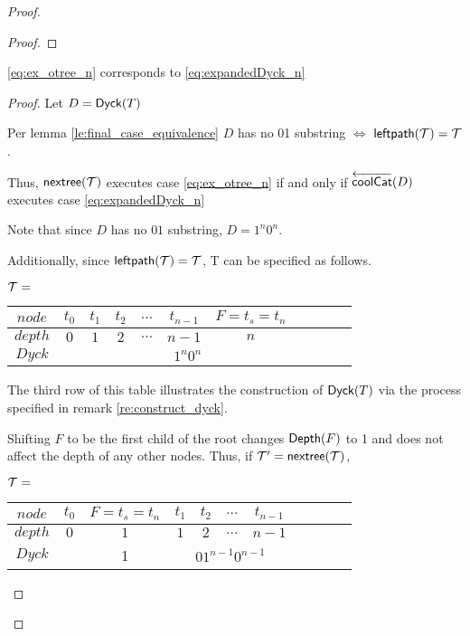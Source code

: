 \begin{proof}
\begin{proof}





\end{proof}
\begin{lemma}
    \eqref{eq:ex_otree_n} corresponds to \eqref{eq:expandedDyck_n}
\end{lemma}
\begin{proof}

    Let $D=\mathsf{Dyck}{(T)}$

    Per lemma \ref{le:final_case_equivalence} $D$ has no 01 substring $\iff$ $\mathsf{leftpath}{(\mathcal{\mathcal{T}})}=\mathcal{T}$.  

    Thus, $\mathsf{nextree}{(\mathcal{T})}$ executes case \eqref{eq:ex_otree_n} if and only if $\overleftarrow{\mathsf{coolCat}}{(D)}$ executes case  \eqref{eq:expandedDyck_n}

    Note that since $D$ has no $01$ substring, $D=1^n0^n$. 

    Additionally, since $\mathsf{leftpath}{(\mathcal{\mathcal{T}})}=\mathcal{T}$, T can be specified as follows.

    $\mathcal{T}=$
    \begin{center}
	\begin{tabular}{ |c|c|c|c|c|c|c|c|c|c|c| } 
	    \hline

	    $node$ & $t_0$ & $t_1$  & $t_2$ & $\dots$ & $t_{n-1}$&$F=t_s=t_n$  \\
	    \hline
	    $depth$ & $0$ & $1$ & $2$ & $\dots$ & $n-1$ & $n$ \\
	    \hline
	    $Dyck$ &  &  \multicolumn{5}{|c|}{$1^n0^n$} \\
	    \hline
	\end{tabular}
    \end{center}

    The third row of this table illustrates the construction of $\mathsf{Dyck}{(T)}$ via the process specified in remark \ref{re:construct_dyck}.

    Shifting $F$ to be the first child of the root changes $\mathsf{Depth}{(F)}$ to 1 and does not affect the depth of any other nodes.  Thus, if $\mathcal{T}'=\mathsf{nextree}{(\mathcal{T})}$, 


    $\mathcal{T}=$
    \begin{center}
	\begin{tabular}{ |c|c|c|c|c|c|c|c|c|c|c| } 
	    \hline

	    $node$ & $t_0$ & $F=t_s=t_n$ & $t_1$  & $t_2$ & $\dots$ & $t_{n-1}$  \\
	    \hline
	    $depth$ & $0$ & $1$ & $1$ & $2$ & $\dots$ & $n-1$ \\
	    \hline
	    $Dyck$ &  &  1 &  \multicolumn{4}{|c|}{$01^{n-1}0^{n-1}$} \\
	    \hline
	\end{tabular}
    \end{center}


\end{proof}
\end{proof}
